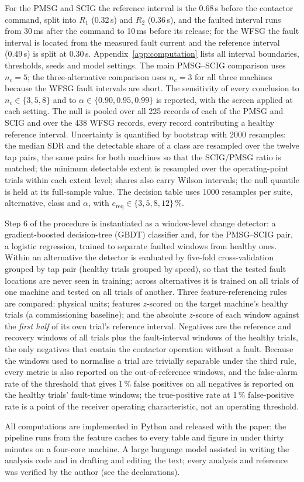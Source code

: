 For the PMSG and SCIG the reference interval is the 0.68\,s before the contactor command, split into $R_1$ (0.32\,s) and $R_2$ (0.36\,s), and the faulted interval runs from 30\,ms after the command to 10\,ms before its release; for the WFSG the fault interval is located from the measured fault current and the reference interval (0.49\,s) is split at 0.30\,s. Appendix~\ref{app:computation} lists all interval boundaries, thresholds, seeds and model settings. The main PMSG--SCIG comparison uses $n_c=5$; the three-alternative comparison uses $n_c=3$ for all three machines because the WFSG fault intervals are short. The sensitivity of every conclusion to $n_c\in\{3,5,8\}$ and to $\alpha\in\{0.90,0.95,0.99\}$ is reported, with the screen applied at each setting. The null is pooled over all 225 records of each of the PMSG and SCIG and over the 438 WFSG records, every record contributing a healthy reference interval. Uncertainty is quantified by bootstrap with 2000 resamples: the median SDR and the detectable share of a class are resampled over the twelve tap pairs, the same pairs for both machines so that the SCIG/PMSG ratio is matched; the minimum detectable extent is resampled over the operating-point trials within each extent level; shares also carry Wilson intervals; the null quantile is held at its full-sample value. The decision table uses 1000 resamples per suite, alternative, class and $\alpha$, with $e_{\mathrm{req}}\in\{3,5,8,12\}$\,\%.

Step 6 of the procedure is instantiated as a window-level change detector: a gradient-boosted decision-tree (GBDT) classifier \citep{Friedman2001} and, for the PMSG--SCIG pair, a logistic regression, trained to separate faulted windows from healthy ones. Within an alternative the detector is evaluated by five-fold cross-validation grouped by tap pair (healthy trials grouped by speed), so that the tested fault locations are never seen in training; across alternatives it is trained on all trials of one machine and tested on all trials of another. Three feature-referencing rules are compared: physical units; features $z$-scored on the target machine's healthy trials (a commissioning baseline); and the absolute $z$-score of each window against the \emph{first half} of its own trial's reference interval. Negatives are the reference and recovery windows of all trials plus the fault-interval windows of the healthy trials, the only negatives that contain the contactor operation without a fault. Because the windows used to normalise a trial are trivially separable under the third rule, every metric is also reported on the out-of-reference windows, and the false-alarm rate of the threshold that gives 1\,\% false positives on all negatives is reported on the healthy trials' fault-time windows; the true-positive rate at 1\,\% false-positive rate is a point of the receiver operating characteristic, not an operating threshold.

All computations are implemented in Python and released with the paper; the pipeline runs from the feature caches to every table and figure in under thirty minutes on a four-core machine. A large language model assisted in writing the analysis code and in drafting and editing the text; every analysis and reference was verified by the author (see the declarations).
